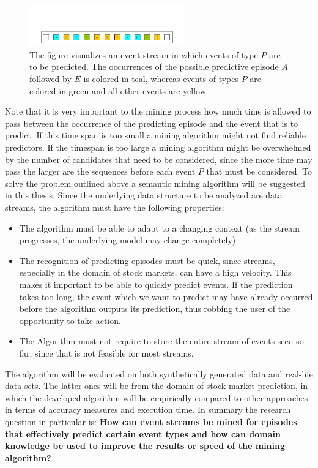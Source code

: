 \begin{figure}[h]
	\centering
  	\includegraphics[width=0.6\textwidth]{examplePrediction.jpg}
	\caption{The figure visualizes an event stream in which events of type $P$ are to be predicted. The occurrences of the possible predictive episode $A$ followed by $E$ is colored in teal, whereas events of types $P$ are colored in green and all other events are yellow}
	\label{fig_predictiveEpisodeExample}
\end{figure}

Note that it is very important to the mining process how much time is allowed to pass between the occurrence of the predicting episode and the event that is to predict. If this time span is too small a mining algorithm might not find reliable predictors. If the timespan is too large a mining algorithm might be overwhelmed by the number of candidates that need to be considered, since the more time may pass the larger are the sequences before each event $P$ that must be considered. %
\newline
To solve the problem outlined above a semantic mining algorithm will be suggested in this thesis. Since the underlying data structure to be analyzed are data streams, the algorithm must have the following properties:
\begin{itemize}
	\item The algorithm must be able to adapt to a changing context (as the stream progresses, the underlying model may change completely)
	\item The recognition of predicting episodes must be quick, since streams, especially in the domain of stock markets, can have a high velocity. This makes it important to be able to quickly predict events. If the prediction takes too long, the event which we want to predict may have already occurred before the algorithm outputs its prediction, thus robbing the user of the opportunity to take action.
	\item The Algorithm must not require to store the entire stream of events seen so far, since that is not feasible for most streams.
\end{itemize}

The algorithm will be evaluated on both synthetically generated data and real-life data-sets. The latter ones will be from the domain of stock market prediction, in which the developed algorithm will be empirically compared to other approaches in terms of accuracy measures and execution time. In summary the research question in particular is:\newline \newline
\textbf{How can event streams be mined for episodes that effectively predict certain event types and how can domain knowledge be used to improve the results or speed of the mining algorithm?}